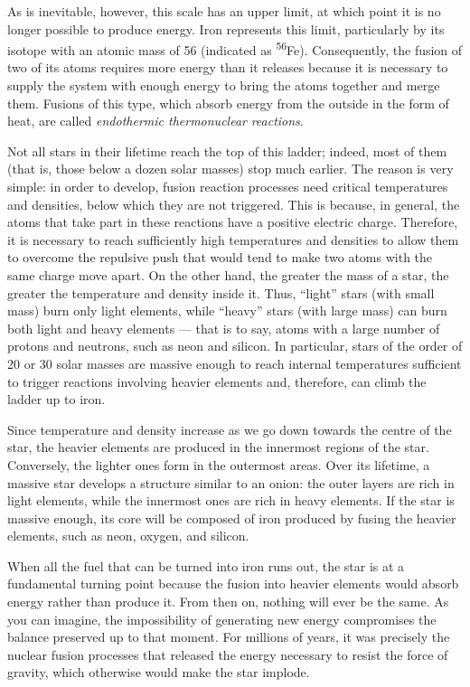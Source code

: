 As is inevitable, however, this scale has an upper limit, at which point it is no longer
possible to produce energy. Iron represents this limit, particularly by its isotope with
an atomic mass of 56 (indicated as \textsuperscript{56}Fe). Consequently, the fusion of
two of its atoms requires more energy than it releases because it is necessary to supply
the system with enough energy to bring the atoms together and merge them. Fusions of
this type, which absorb energy from the outside in the form of heat, are called
\emph{endothermic thermonuclear} \emph{reactions}.

Not all stars in their lifetime reach the top of this ladder; indeed, most of them (that
is, those below a dozen solar masses) stop much earlier. The reason is very simple: in
order to develop, fusion reaction processes need critical temperatures and densities,
below which they are not triggered. This is because, in general, the atoms that take
part in these reactions have a positive electric charge. Therefore, it is necessary to
reach sufficiently high temperatures and densities to allow them to overcome the
repulsive push that would tend to make two atoms with the same charge move apart. On the
other hand, the greater the mass of a star, the greater the temperature and density
inside it. Thus, ``light'' stars (with small mass) burn only light elements, while
``heavy'' stars (with large mass) can burn both light and heavy elements --- that is to
say, atoms with a large number of protons and neutrons, such as neon and silicon. In
particular, stars of the order of 20 or 30 solar masses are massive enough to reach
internal temperatures sufficient to trigger reactions involving heavier elements and,
therefore, can climb the ladder up to iron.

Since temperature and density increase as we go down towards the centre of the star, the
heavier elements are produced in the innermost regions of the star. Conversely, the
lighter ones form in the outermost areas. Over its lifetime, a massive star develops a
structure similar to an onion: the outer layers are rich in light elements, while the
innermost ones are rich in heavy elements. If the star is massive enough, its core will
be composed of iron produced by fusing the heavier elements, such as
neon, oxygen, and silicon.

When all the fuel that can be turned into iron runs out, the star is at a fundamental
turning point because the fusion into heavier elements would absorb energy rather than
produce it. From then on, nothing will ever be the same. As you can imagine, the
impossibility of generating new energy compromises the balance preserved up to that
moment. For millions of years, it was precisely the nuclear fusion processes that
released the energy necessary to resist the force of gravity, which otherwise would make
the star implode.

